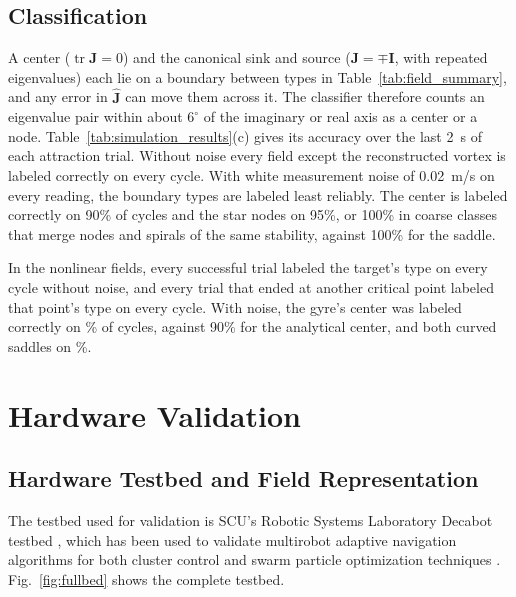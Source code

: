 \documentclass[lettersize,journal]{IEEEtran}
\newcommand{\rev}[1]{#1}                             %
\begin{document}
\subsection{Classification}

A center ($\operatorname{tr}\mathbf{J} = 0$) and the canonical sink and source ($\mathbf{J} = \mp\mathbf{I}$, with repeated eigenvalues) each lie on a boundary between types in Table~\ref{tab:field_summary}, and any error in $\hat{\mathbf{J}}$ can move them across it. The classifier therefore counts an eigenvalue pair within about $6^\circ$ of the imaginary or real axis as a center or a node. Table~\ref{tab:simulation_results}(c) gives its accuracy over the last 2~s of each attraction trial. Without noise every field except the reconstructed vortex is labeled correctly on every cycle. With white measurement noise of 0.02~m/s on every reading, the boundary types are labeled least reliably. The center is labeled correctly on \rev{90}\% of cycles and the star nodes on \rev{95}\%, or \rev{100}\% in coarse classes that merge nodes and spirals of the same stability, against \rev{100}\% for the saddle. %

In the nonlinear fields, every successful trial labeled the target's type on every cycle without noise, and every trial that ended at another critical point labeled that point's type on every cycle. With noise, the gyre's center was labeled correctly on \% of cycles, against \rev{90}\% for the analytical center, and both curved saddles on \%. %

\section{Hardware Validation}


\subsection{Hardware Testbed and Field Representation}

The testbed used for validation is SCU's Robotic Systems Laboratory Decabot testbed \cite{52}, which has been used to validate multirobot adaptive navigation algorithms for both cluster control and swarm particle optimization techniques \cite{8,53}. Fig.~\ref{fig:fullbed} shows the complete testbed.
\end{document}

